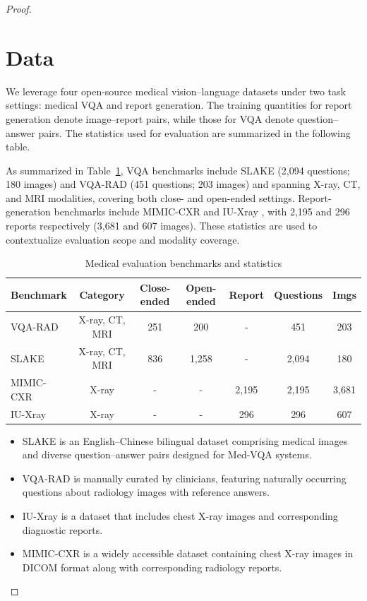 \begin{proof}
\section{Data}
\label{supp:data}
We leverage four open-source medical vision–language datasets under two task settings: medical VQA and report generation. The training quantities for report generation denote image–report pairs, while those for VQA denote question–answer pairs. The statistics used for evaluation are summarized in the following table.

As summarized in Table~\ref{tab:data_splits}, VQA benchmarks include SLAKE \cite{liu2021slake} (2,094 questions; 180 images) and VQA-RAD \cite{Lau2018VQARAD} (451 questions; 203 images) and  spanning X-ray, CT, and MRI modalities, covering both close- and open-ended settings. Report-generation benchmarks include MIMIC-CXR \cite{johnson2019mimic} and IU-Xray \cite{demner2015preparing}, with 2,195 and 296 reports respectively (3,681 and 607 images). These statistics are used to contextualize evaluation scope and modality coverage.

\begin{table}[t]
\centering
\scriptsize
\caption{Medical evaluation benchmarks and statistics}
\begin{tabular}{lcccccc}
\toprule
Benchmark & Category & Close-ended & Open-ended & Report & Questions & Imgs \\
\midrule
VQA-RAD & X-ray, CT, MRI & 251 & 200 & - & 451 & 203 \\
SLAKE & X-ray, CT, MRI & 836 & 1,258 & - & 2,094 & 180 \\
MIMIC-CXR & X-ray & - & - & 2,195 & 2,195 & 3,681 \\
IU-Xray & X-ray & - & - & 296 & 296 & 607 \\
\bottomrule
\end{tabular}
\label{tab:data_splits}
\end{table}


\begin{itemize}
\item SLAKE \cite{liu2021slake} is an English–Chinese bilingual dataset comprising medical images and diverse question–answer pairs designed for Med-VQA systems.
\item VQA-RAD \cite{Lau2018VQARAD} is manually curated by clinicians, featuring naturally occurring questions about radiology images with reference answers.
\item IU-Xray \cite{demner2015preparing} is a dataset that includes chest X-ray images and corresponding diagnostic reports.
\item MIMIC-CXR \cite{johnson2019mimic} is a widely accessible dataset containing chest X-ray images in DICOM format along with corresponding radiology reports.
\end{itemize}





\end{proof}
